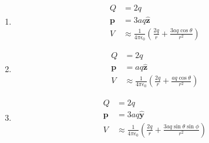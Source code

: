 \documentclass{article}
\renewcommand{\vec}[1]{\boldsymbol{\mathbf{#1}}}
\newcommand{\uvec}[1]{\hat{\vec{#1}}}
\newcommand{\ke}{\frac{1}{4 \pi \epsilon_0}}
\begin{document}
\setcounter{subsection}{31}
\subsection{}

\begin{enumerate}
  \item

        \begin{align*}
          Q       & = 2 q                                                                    \\
          \vec{p} & = 3 a q \uvec{z}                                                         \\
          V       & \approx \ke \left( \frac{2 q}{r} + \frac{3 a q \cos \theta}{r^2} \right)
        \end{align*}

  \item

        \begin{align*}
          Q       & = 2 q                                                                  \\
          \vec{p} & = a q \uvec{z}                                                         \\
          V       & \approx \ke \left( \frac{2 q}{r} + \frac{a q \cos \theta}{r^2} \right)
        \end{align*}

  \item

        \begin{align*}
          Q       & = 2 q                                                                              \\
          \vec{p} & = 3 a q \uvec{y}                                                                   \\
          V       & \approx \ke \left( \frac{2 q}{r} + \frac{3 a q \sin \theta \sin \phi}{r^2} \right)
        \end{align*}
\end{enumerate}

\subsection{}
\end{document}
